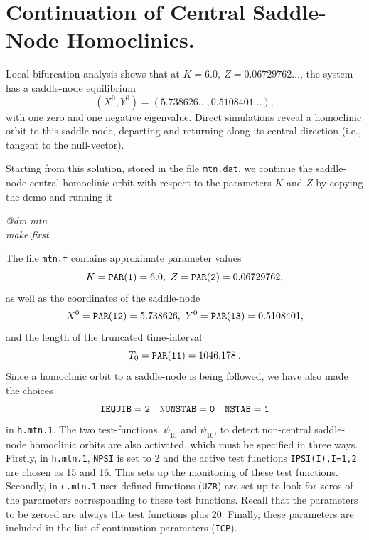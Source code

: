 \documentclass[12pt]{report}
\begin{document}
\section{Continuation of Central Saddle-Node Homoclinics.}
Local bifurcation analysis shows that at $K=6.0,\ Z=0.06729762\ldots$,
the system has a saddle-node equilibrium 
$$
(X^0,Y^0) = (5.738626\ldots,0.5108401\ldots),
$$
with one zero and one negative eigenvalue. Direct simulations reveal a
homoclinic 
orbit to this saddle-node, departing and returning along its central
direction (i.e., tangent to the null-vector).
\par
Starting from this solution, stored in the file {\tt mtn.dat}, we
continue the saddle-node central homoclinic orbit 
with respect to the parameters $K$ and $Z$ by copying the
demo and running it
\begin{center}
{\it @dm mtn}\\
{\it make first}
\end{center}
The file {\tt mtn.f} contains approximate
parameter values
$$
K={\tt PAR(1)}=6.0,\ Z={\tt PAR(2)}=0.06729762,
$$
as well as the coordinates of the saddle-node
$$
X^0={\tt PAR(12)}=5.738626,\ Y^0={\tt PAR(13)}=0.5108401,
$$
and the length of the truncated time-interval
$$
T_0={\tt PAR(11)} = 1046.178 \: .
$$
Since a homoclinic orbit to a saddle-node is being followed, we have also
made the choices
$$
{\tt IEQUIB = 2 \quad NUNSTAB =0 \quad NSTAB = 1   }
$$
in {\tt h.mtn.1}. The two test-functions, $\psi_{15}$ and $\psi_{16}$, 
to detect non-central saddle-node homoclinic
orbits are also activated, which must be specified in three ways. 
Firstly, in {\tt h.mtn.1}, {\tt NPSI} is
set to 2 and the active test functions {\tt IPSI(I),I=1,2}
are chosen as 15 and 16. This sets up the monitoring of these
test functions. Secondly, in {\tt c.mtn.1} user-defined functions
({\tt UZR}) are set up to look for zeros of the parameters
corresponding to these test functions. Recall that the
parameters to be zeroed are always the test functions plus 20.
Finally, these parameters are included in the list of continuation
parameters ({\tt ICP}).
\end{document}
